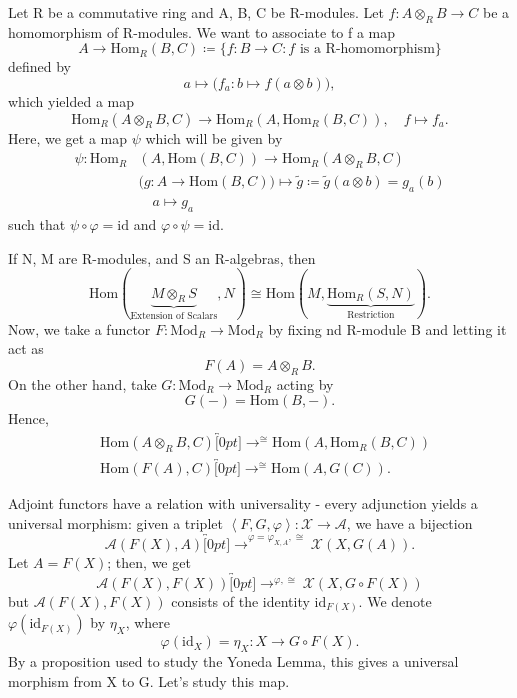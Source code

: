 \documentclass[../category_theory.tex]{subfiles}
\begin{document}
\begin{example}
	Let R be a commutative ring and A, B, C be R-modules. Let \(f :A \otimes _{R}B\rightarrow C\) be a homomorphism of R-modules. We want to associate to f a map
	\[
		A\longrightarrow \mathrm{Hom}_{R}(B, C)\coloneqq \{f:B\rightarrow C: f\text{ is a R-homomorphism}\}
	\]
	defined by
	\[
		a\mapsto \biggl(f_{a}:b\mapsto f(a\otimes b)\biggr),
	\]
	which yielded a map
	\[
		\mathrm{Hom}_{R}(A\otimes_{R}B, C)\longrightarrow \mathrm{Hom}_{R}(A, \mathrm{Hom}_{R}(B, C)),\quad f\mapsto f_{a}.
	\]
	Here, we get a map \(\psi\) which will be given by
	\begin{align*}
		\psi:\mathrm{Hom}_{R} & (A, \mathrm{Hom}(B, C))\rightarrow \mathrm{Hom}_{R}(A\otimes _{R}B, C)                                  \\
		                      & \biggl(g: A\rightarrow \mathrm{Hom}(B, C)\biggr)\mapsto \tilde g\coloneqq \tilde g(a\otimes b)=g_{a}(b) \\
		                      & \quad a\mapsto g_{a}
	\end{align*}
	such that \(\psi \circ \varphi =\mathrm{id}\) and \(\varphi \circ \psi=\mathrm{id}.\)

	If N, M are R-modules, and S an R-algebras, then
	\[
		\mathrm{Hom}(\underbrace{M\otimes _{R}S}_{\text{Extension of Scalars}}, N)\cong \mathrm{Hom}(M, \underbrace{\mathrm{Hom}_{R}(S, N)}_{\text{Restriction}}).
	\]
	Now, we take a functor \(F:\mathrm{Mod}_{R}\rightarrow \mathrm{Mod}_{R}\) by fixing nd R-module B and letting it act as
	\[
		F(A)=A\otimes _{R}B.
	\]
	On the other hand, take \(G:\mathrm{Mod}_{R}\rightarrow \mathrm{Mod}_{R}\) acting by
	\[
		G(-)=\mathrm{Hom}(B, -).
	\]
	Hence,
	\begin{align*}
		 & \mathrm{Hom}(A\otimes_{R}B, C)\overbracket[0pt]{\longrightarrow}^{\cong  }\mathrm{Hom}(A, \mathrm{Hom}_{R}(B, C)) \\
		 & \mathrm{Hom}(F(A), C)\overbracket[0pt]{\longrightarrow}^{\cong  }\mathrm{Hom}(A, G(C)).
	\end{align*}
\end{example}
Adjoint functors have a relation with universality - every adjunction yields a universal morphism: given a triplet \(\left< F, G, \varphi  \right>:\mathcal{X}\rightarrow \mathcal{A}\), we have a bijection
\[
	\mathcal{A}(F(X), A)\overbracket[0pt]{\longrightarrow}^{\varphi =\varphi_{X, A}, \cong  }\mathcal{X}(X, G(A)).
\]
Let \(A=F(X)\); then, we get
\[
	\mathcal{A}(F(X), F(X))\overbracket[0pt]{\longrightarrow}^{\varphi, \cong  }\mathcal{X}(X, G\circ F(X))
\]
but \(\mathcal{A}(F(X), F(X))\) consists of the identity \(\mathrm{id}_{F(X)}\). We denote \(\varphi(\mathrm{id}_{F(X)})\) by \(\eta_{X}\), where
\[
	\varphi (\mathrm{id}_{X})=\eta_{X}:X\rightarrow G\circ F(X).
\]
By a proposition used to study the Yoneda Lemma, this gives a universal morphism from X to G. Let's study this map.
\end{document}
